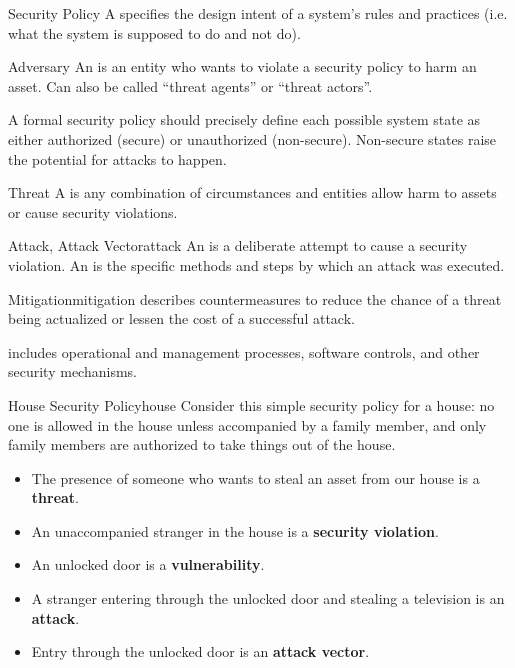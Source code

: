 \documentclass[12pt]{report}
\begin{document}
\begin{dfnbox}{Security Policy}{}
    A  specifies the design intent of a system's rules and practices (i.e. what the system is supposed to do and not do).
\end{dfnbox}

\begin{dfnbox}{Adversary}{}
    An  is an entity who wants to violate a security policy to harm an asset.
    \tcblower
    Can also be called ``threat agents'' or ``threat actors''.
\end{dfnbox}

A formal security policy should precisely define each possible system state as either authorized (secure) or unauthorized (non-secure). Non-secure states raise the potential for attacks to happen.

\begin{dfnbox}{Threat}{}
    A  is any combination of circumstances and entities allow harm to assets or cause security violations.
\end{dfnbox}

\begin{dfnbox}{Attack, Attack Vector}{attack}
    An  is a deliberate attempt to cause a security violation. An  is the specific methods and steps by which an attack was executed.

\end{dfnbox}

\begin{dfnbox}{Mitigation}{mitigation}
     describes countermeasures to reduce the chance of a threat being actualized or lessen the cost of a successful attack.
\end{dfnbox}

 includes operational and management processes, software controls, and other security mechanisms.

\begin{exbox}{House Security Policy}{house}
    Consider this simple security policy for a house: no one is allowed in the house unless accompanied by a family member, and only family members are authorized to take things out of the house.
    \begin{itemize}
        \item The presence of someone who wants to steal an asset from our house is a \textbf{threat}.
        \item An unaccompanied stranger in the house is a \textbf{security violation}.
        \item An unlocked door is a \textbf{vulnerability}.
        \item A stranger entering through the unlocked door and stealing a television is an \textbf{attack}.
        \item Entry through the unlocked door is an \textbf{attack vector}.
    \end{itemize}
\end{exbox}
\end{document}
